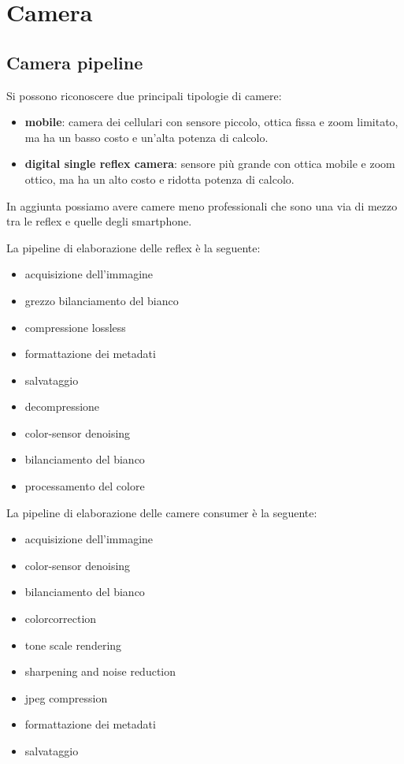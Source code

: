 \chapter{Camera}
\section{Camera pipeline}
Si possono riconoscere due principali tipologie di camere:
\begin{itemize}
    \item \textbf{mobile}: camera dei cellulari con sensore piccolo, ottica fissa 
    e zoom limitato, ma ha un basso costo e un'alta potenza di calcolo.
    \item \textbf{digital single reflex camera}: sensore più grande con ottica mobile 
    e zoom ottico, ma ha un alto costo e ridotta potenza di calcolo.
\end{itemize}

In aggiunta possiamo avere camere meno professionali che sono una via di mezzo 
tra le reflex e quelle degli smartphone.

La pipeline di elaborazione delle reflex è la seguente:
\begin{itemize}
    \item acquisizione dell'immagine
    \item grezzo bilanciamento del bianco
    \item compressione lossless
    \item formattazione dei metadati
    \item salvataggio
    \item decompressione
    \item color-sensor denoising
    \item bilanciamento del bianco
    \item processamento del colore
\end{itemize}

La pipeline di elaborazione delle camere consumer è la seguente:
\begin{itemize}
    \item acquisizione dell'immagine
    \item color-sensor denoising
    \item bilanciamento del bianco
    \item colorcorrection
    \item tone scale rendering
    \item sharpening and noise reduction
    \item jpeg compression
    \item formattazione dei metadati
    \item salvataggio
\end{itemize}

